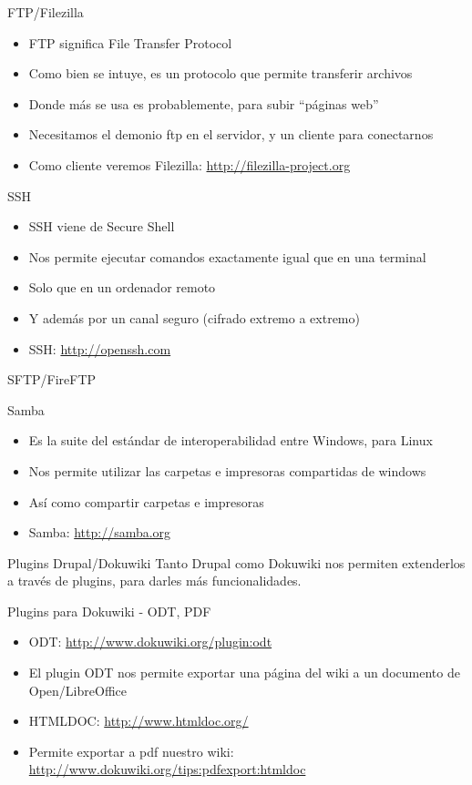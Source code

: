 \documentclass[spanish]{beamer}
\begin{document}
\begin{frame}{FTP/Filezilla}
\begin{itemize}
\item FTP significa File Transfer Protocol
\item Como bien se intuye, es un protocolo que permite transferir archivos
\item Donde más se usa es probablemente, para subir ``páginas web''
\item Necesitamos el demonio ftp en el servidor, y un cliente para conectarnos
\item Como cliente veremos Filezilla: \url{http://filezilla-project.org}
\end{itemize}
\end{frame}
\begin{frame}{SSH}
\begin{itemize}
\item SSH viene de Secure Shell
\item Nos permite ejecutar comandos exactamente igual que en una terminal
\item Solo que en un ordenador remoto
\item Y además por un canal seguro (cifrado extremo a extremo)
\item SSH: \url{http://openssh.com}
\end{itemize}
\end{frame}
\begin{frame}{SFTP/FireFTP}
\end{frame}
\begin{frame}{Samba}
\begin{itemize}
\item Es la suite del estándar de interoperabilidad entre Windows, para Linux
\item Nos permite utilizar las carpetas e impresoras compartidas de windows 
\item Así como compartir carpetas e impresoras
\item Samba: \url{http://samba.org}
\end{itemize}
\end{frame}
\begin{frame}{Plugins Drupal/Dokuwiki}
Tanto Drupal como Dokuwiki nos permiten extenderlos a través de plugins, para
 darles más funcionalidades.
\end{frame}
\begin{frame}{Plugins para Dokuwiki - ODT, PDF}
\begin{itemize}
\item ODT: \url{http://www.dokuwiki.org/plugin:odt}
\item El plugin ODT nos permite exportar una página del wiki a un documento de
 Open/LibreOffice
\item HTMLDOC: \url{http://www.htmldoc.org/} 
\item Permite exportar a pdf nuestro wiki: \url{http://www.dokuwiki.org/tips:pdfexport:htmldoc}
\end{itemize}
\end{frame}
\end{document}
